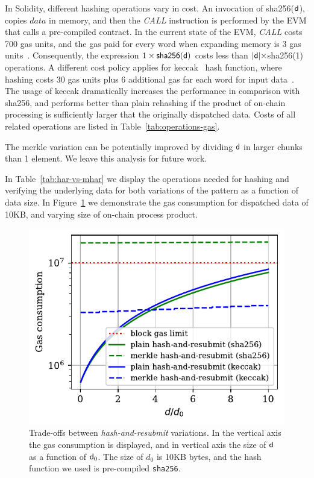 In Solidity, different hashing operations vary in cost. An invocation of
\textsf{sha256}($\mathsf{d}$), copies $data$ in memory, and then the
\emph{CALL} instruction is performed by the EVM that calls a pre-compiled
contract. In the current state of the EVM, \emph{CALL} costs 700 gas units, and
the gas paid for every word when expanding memory is 3 gas units~\cite{wood}.
Consequently, the expression $1 \times \textsf{sha256}(\mathsf{d})$ costs less than
$|\mathsf{d}| \times $\textsf{sha256}(1) operations. A different cost policy applies
for \textsf{keccak}~\cite{keccak} hash function, where hashing costs 30 gas
units plus 6 additional gas far each word for input data~\cite{wood}. The usage
of \textsf{keccak} dramatically increases the performance in comparison with
\textsf{sha256}, and performs better than plain rehashing if the product of
on-chain processing is sufficiently larger that the originally dispatched data.
Costs of all related operations are listed in Table~\ref{tab:operations-gas}.

The merkle variation can be potentially improved by dividing $\mathsf{d}$ in larger
chunks than 1 element. We leave this analysis for future work.



In Table~\ref{tab:har-vs-mhar} we display the operations needed for hashing and
verifying the underlying data for both variations of the pattern as a function
of data size. In Figure~\ref{fig:har-vs-mhar} we demonstrate the gas
consumption for dispatched data of 10KB, and varying size of on-chain
process product.



\begin{figure}[h]
    \begin{center}
        \includegraphics[width=1\columnwidth]{figures/har-vs-mhar.pdf}
    \end{center}
    \caption{Trade-offs between \emph{hash-and-resubmit} variations. In the
    vertical axis the gas consumption is displayed, and in vertical axis the
    size of $\mathsf{d}$ as a function of $\mathsf{d}_0$. The size of $d_0$ is 10KB
    bytes, and the hash function we used is pre-compiled \texttt{sha256}.}
    \label{fig:har-vs-mhar}
\end{figure}

